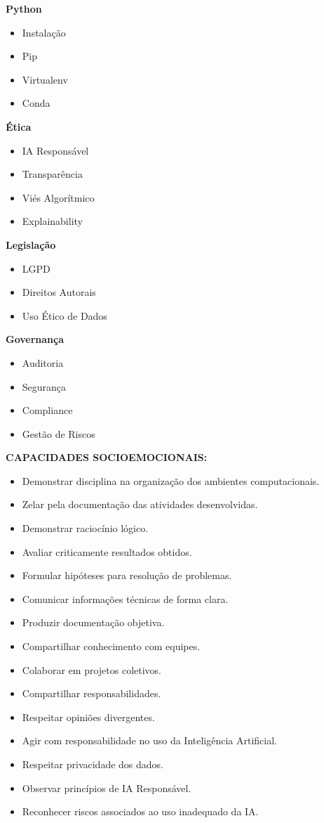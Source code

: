 \textbf{Python}
\begin{itemize}
    \item Instalação
    \item Pip
    \item Virtualenv
    \item Conda
\end{itemize}

\textbf{Ética}
\begin{itemize}
    \item IA Responsável
    \item Transparência
    \item Viés Algorítmico
    \item Explainability
\end{itemize}

\textbf{Legislação}
\begin{itemize}
    \item LGPD
    \item Direitos Autorais
    \item Uso Ético de Dados
\end{itemize}

\textbf{Governança}
\begin{itemize}
    \item Auditoria
    \item Segurança
    \item Compliance
    \item Gestão de Riscos
\end{itemize}

\textbf{CAPACIDADES SOCIOEMOCIONAIS:}
\begin{itemize}
    \item Demonstrar disciplina na organização dos ambientes computacionais.
    \item Zelar pela documentação das atividades desenvolvidas.
    \item Demonstrar raciocínio lógico.
    \item Avaliar criticamente resultados obtidos.
    \item Formular hipóteses para resolução de problemas.
    \item Comunicar informações técnicas de forma clara.
    \item Produzir documentação objetiva.
    \item Compartilhar conhecimento com equipes.
    \item Colaborar em projetos coletivos.
    \item Compartilhar responsabilidades.
    \item Respeitar opiniões divergentes.
    \item Agir com responsabilidade no uso da Inteligência Artificial.
    \item Respeitar privacidade dos dados.
    \item Observar princípios de IA Responsável.
    \item Reconhecer riscos associados ao uso inadequado da IA.
\end{itemize}

